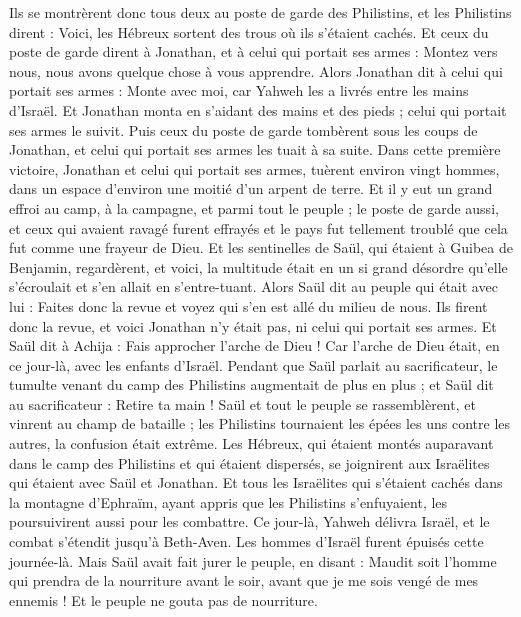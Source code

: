\begin{multicols}{2}
Ils se montrèrent donc tous deux au poste de garde des Philistins, et les Philistins dirent : Voici, les Hébreux sortent des trous où ils s'étaient cachés.
Et ceux du poste de garde dirent à Jonathan, et à celui qui portait ses armes : Montez vers nous, nous avons quelque chose à vous apprendre. Alors Jonathan dit à celui qui portait ses armes : Monte avec moi, car Yahweh les a livrés entre les mains d'Israël.
Et Jonathan monta en s'aidant des mains et des pieds ; celui qui portait ses armes le suivit. Puis ceux du poste de garde tombèrent sous les coups de Jonathan, et celui qui portait ses armes les tuait à sa suite.
Dans cette première victoire, Jonathan et celui qui portait ses armes, tuèrent environ vingt hommes, dans un espace d'environ une moitié d'un arpent de terre.
Et il y eut un grand effroi au camp, à la campagne, et parmi tout le peuple ; le poste de garde aussi, et ceux qui avaient ravagé furent effrayés et le pays fut tellement troublé que cela fut comme une frayeur de Dieu.
Et les sentinelles de Saül, qui étaient à Guibea de Benjamin, regardèrent, et voici, la multitude était en un si grand désordre qu'elle s'écroulait et s'en allait en s'entre-tuant.
Alors Saül dit au peuple qui était avec lui : Faites donc la revue et voyez qui s'en est allé du milieu de nous. Ils firent donc la revue, et voici Jonathan n'y était pas, ni celui qui portait ses armes.
Et Saül dit à Achija : Fais approcher l'arche de Dieu ! Car l'arche de Dieu était, en ce jour-là, avec les enfants d'Israël.
Pendant que Saül parlait au sacrificateur, le tumulte venant du camp des Philistins augmentait de plus en plus ; et Saül dit au sacrificateur : Retire ta main !
Saül et tout le peuple se rassemblèrent, et vinrent au champ de bataille ; les Philistins tournaient les épées les uns contre les autres, la confusion était extrême.
Les Hébreux, qui étaient montés auparavant dans le camp des Philistins et qui étaient dispersés, se joignirent aux Israëlites qui étaient avec Saül et Jonathan.
Et tous les Israëlites qui s'étaient cachés dans la montagne d'Ephraïm, ayant appris que les Philistins s'enfuyaient, les poursuivirent aussi pour les combattre.
Ce jour-là, Yahweh délivra Israël, et le combat s'étendit jusqu'à Beth-Aven.
Les hommes d'Israël furent épuisés cette journée-là. Mais Saül avait fait jurer le peuple, en disant : Maudit soit l'homme qui prendra de la nourriture avant le soir, avant que je me sois vengé de mes ennemis ! Et le peuple ne gouta pas de nourriture.

\end{multicols}
